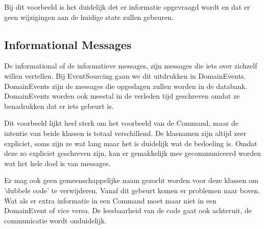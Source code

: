 
Bij dit voorbeeld is het duidelijk det er informatie opgevraagd wordt en dat er geen wijzigingen aan de huidige state zullen gebeuren.

\subsection{Informational Messages}
\label{subsec:informational-messages}

De informational of de informatieve messages, zijn messages die iets over zichzelf willen vertellen. Bij EventSourcing gaan we dit uitdrukken in DomainEvents. DomainEvents zijn de messages die opgeslagen zullen worden in de databank. DomainEvents worden ook meestal in de verleden tijd geschreven omdat ze benadrukken dat er iets gebeurt is.


Dit voorbeeld lijkt heel sterk om het voorbeeld van de Command, maar de intentie van beide klassen is totaal verschillend. De klasnamen zijn altijd zeer expliciet, soms zijn ze wat lang maar het is duidelijk wat de bedoeling is. Omdat deze zo expliciet geschreven zijn, kan er gemakkelijk mee gecommuniceerd worden wat het hele doel is van messages.

Er mag ook geen gemeenschappelijke naam gezocht worden voor deze klassen om 'dubbele code' te verwijderen. Vanaf dit gebeurt komen er problemen naar boven. Wat als er extra informatie in een Command moet maar niet in een DomainEvent of vice versa. De leesbaarheid van de code gaat ook achteruit, de communicatie wordt onduidelijk.
